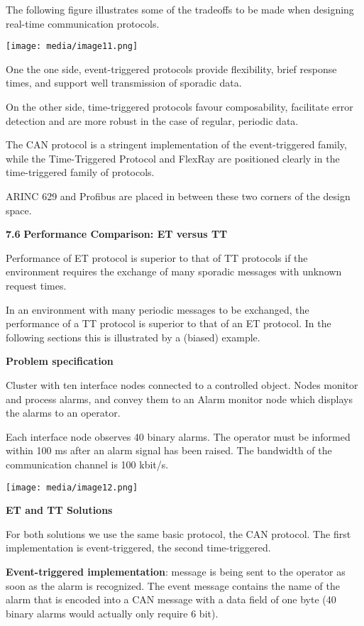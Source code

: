 The following figure illustrates some of the tradeoffs to be made when
designing real-time communication protocols.

\texttt{[image: media/image11.png]}

One the one side, event-triggered protocols provide flexibility, brief
response times, and support well transmission of sporadic data.

On the other side, time-triggered protocols favour composability,
facilitate error detection and are more robust in the case of regular,
periodic data.

The CAN protocol is a stringent implementation of the event-triggered
family, while the Time-Triggered Protocol and FlexRay are positioned
clearly in the time-triggered family of protocols.

ARINC 629 and Profibus are placed in between these two corners of the
design space.

\textbf{7.6} \protect\hypertarget{teil7}{}{}\textbf{Performance
Comparison: ET versus TT}

Performance of ET protocol is superior to that of TT protocols if the
environment requires the exchange of many sporadic messages with unknown
request times.

In an environment with many periodic messages to be exchanged, the
performance of a TT protocol is superior to that of an ET protocol. In
the following sections this is illustrated by a (biased) example.

\textbf{Problem specification}

Cluster with ten interface nodes connected to a controlled object. Nodes
monitor and process alarms, and convey them to an Alarm monitor node
which displays the alarms to an operator.

Each interface node observes 40 binary alarms. The operator must be
informed within 100 ms after an alarm signal has been raised. The
bandwidth of the communication channel is 100 kbit/s.

\texttt{[image: media/image12.png]}

\textbf{ET and TT Solutions}

For both solutions we use the same basic protocol, the CAN protocol. The
first implementation is event-triggered, the second time-triggered.

\textbf{Event-triggered implementation}: message is being sent to the
operator as soon as the alarm is recognized. The event message contains
the name of the alarm that is encoded into a CAN message with a data
field of one byte (40 binary alarms would actually only require 6 bit).

